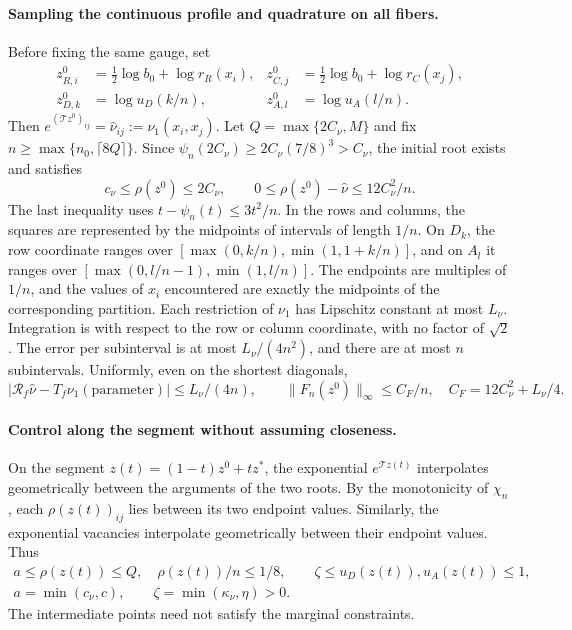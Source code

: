 \paragraph{Sampling the continuous profile and quadrature on all fibers.}
Before fixing the same gauge, set
\[
 \begin{aligned}
 z^0_{R,i}&=\tfrac12\log b_0+\log r_R(x_i), & z^0_{C,j}&=\tfrac12\log b_0+\log r_C(x_j),\\
 z^0_{D,k}&=\log u_D(k/n), & z^0_{A,l}&=\log u_A(l/n).
 \end{aligned}                                          \tag{TR6}
\]
Then $e^{(\mathcal Tz^0)_{ij}}=\widehat\nu_{ij}:=\nu_1(x_i,x_j)$.
Let $Q=\max\{2C_\nu,M\}$ and fix $n\ge\max\{n_0,\lceil8Q\rceil\}$.
Since $\psi_n(2C_\nu)\ge2C_\nu(7/8)^3>C_\nu$,
the initial root exists and satisfies
\[
 c_\nu\le\rho(z^0)\le2C_\nu,\qquad
 0\le\rho(z^0)-\widehat\nu\le12C_\nu^2/n.
                                                        \tag{TR7}
\]
The last inequality uses $t-\psi_n(t)\le3t^2/n$.
In the rows and columns, the squares are represented by the midpoints of intervals of length $1/n$.
On $D_k$, the row coordinate ranges over
$[\max(0,k/n),\min(1,1+k/n)]$, and on $A_l$ it ranges over
$[\max(0,l/n-1),\min(1,l/n)]$.
The endpoints are multiples of $1/n$, and the values of $x_i$ encountered are
exactly the midpoints of the corresponding partition.
Each restriction of $\nu_1$ has Lipschitz constant at most $L_\nu$.
Integration is with respect to the row or column coordinate, with no factor of $\sqrt2$.
The error per subinterval is at most $L_\nu/(4n^2)$, and there are at most
$n$ subintervals. Uniformly, even on the shortest diagonals,
\[
 |\mathcal R_f\widehat\nu-T_f\nu_1(\text{parameter})|
 \le L_\nu/(4n),\qquad
 \|F_n(z^0)\|_\infty\le C_F/n,\quad C_F=12C_\nu^2+L_\nu/4.
                                                        \tag{TR8}
\]

\paragraph{Control along the segment without assuming closeness.}
On the segment $z(t)=(1-t)z^0+tz^*$, the exponential $e^{\mathcal Tz(t)}$ interpolates geometrically
between the arguments of the two roots. By the monotonicity of $\chi_n$, each
$\rho(z(t))_{ij}$ lies between its two endpoint values. Similarly, the
exponential vacancies interpolate geometrically between their endpoint values. Thus
\[
 \begin{gathered}
 a\le\rho(z(t))\le Q,\quad \rho(z(t))/n\le1/8,\qquad
 \zeta\le u_D(z(t)),u_A(z(t))\le1,\\
 a=\min(c_\nu,c),\qquad\zeta=\min(\kappa_\nu,\eta)>0.
 \end{gathered}                                         \tag{TR9}
\]
The intermediate points need not satisfy the marginal constraints.
